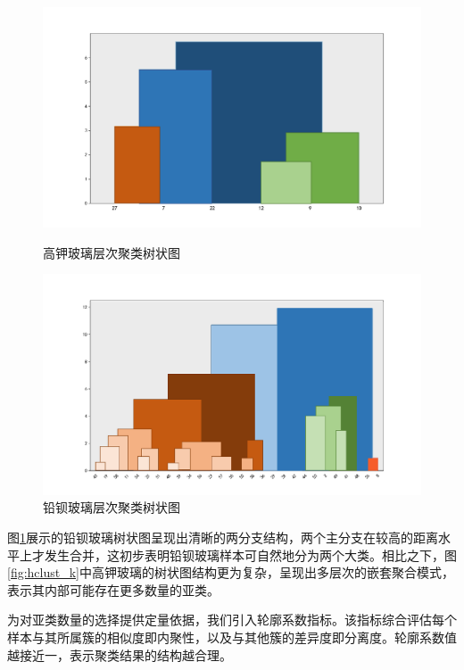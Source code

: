 \begin{figure}[H]
    \centering
    \begin{minipage}{0.48\textwidth}
        \centering
        \includegraphics[width=\linewidth]{figs/4问题二/高钾玻璃_层次聚类树状图.png}
        \caption{高钾玻璃层次聚类树状图}
        \label{fig:hclust_k}
    \end{minipage}\hfill
    \begin{minipage}{0.48\textwidth}
        \centering
        \includegraphics[width=\linewidth]{figs/4问题二/铅钡玻璃_层次聚类树状图.png}
        \caption{铅钡玻璃层次聚类树状图}
        \label{fig:hclust_pb}
    \end{minipage}
\end{figure}

图\ref{fig:hclust_pb}展示的铅钡玻璃树状图呈现出清晰的两分支结构，两个主分支在较高的距离水平上才发生合并，这初步表明铅钡玻璃样本可自然地分为两个大类。相比之下，图\ref{fig:hclust_k}中高钾玻璃的树状图结构更为复杂，呈现出多层次的嵌套聚合模式，表示其内部可能存在更多数量的亚类。

为对亚类数量的选择提供定量依据，我们引入轮廓系数指标。该指标综合评估每个样本与其所属簇的相似度即内聚性，以及与其他簇的差异度即分离度。轮廓系数值越接近一，表示聚类结果的结构越合理。

